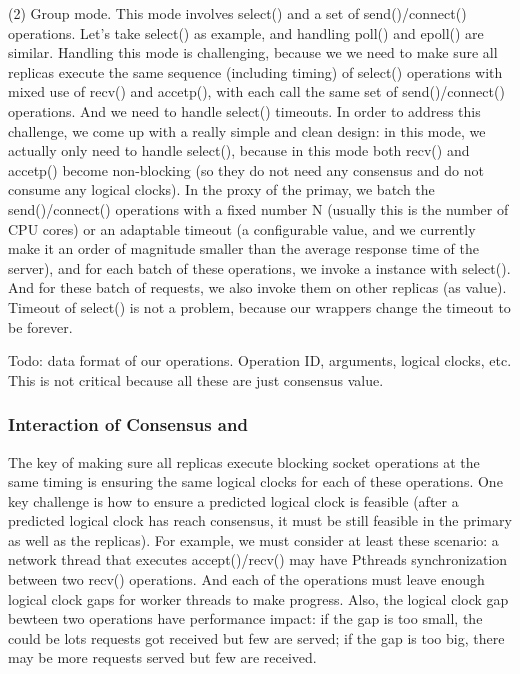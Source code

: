 (2) Group mode. This mode involves select() and a set of send()/connect() 
operations. Let's take select() as example, and handling poll() and epoll() are 
similar. Handling this mode is challenging, because we we need to make sure 
all replicas execute the same sequence (including timing) of 
select() operations with mixed use of recv() and accetp(), with each call 
the same set of send()/connect() operations. And we need to handle select() 
timeouts. In order to address this challenge, we come up with a really simple 
and clean design: in this mode, we actually only need to handle select(), 
because in this mode both recv() and accetp() become non-blocking (so they do 
not need any consensus and do not consume any logical clocks). In the 
proxy of the primay, we batch the send()/connect() operations with a fixed 
number N (usually this is the number of CPU cores) or an adaptable timeout (a 
configurable value, and we currently make it an order of magnitude smaller than the 
average response time of the server), and for each batch of these operations, 
we invoke a \paxos instance with select(). And for these batch of requests, we 
also invoke them on other replicas (as \paxos value). Timeout of select() is 
not a problem, because our \smt wrappers change the timeout to be forever.

Todo: data format of our operations. Operation ID, arguments, logical clocks, 
etc. This is not critical because all these are just \paxos consensus value.

\subsubsection{Interaction of Consensus and \smt} \label{sec:rep-interface}

The key of making sure all replicas execute blocking socket operations at the 
same timing is ensuring the same logical clocks for each of these operations. 
One key challenge is how to ensure a predicted logical clock is 
feasible (\ie after a predicted logical clock has reach consensus, it must be 
still feasible in the primary as well as the replicas). For example, we must 
consider at least these scenario: a network thread that executes 
accept()/recv() may have Pthreads synchronization between two recv() operations.
And each of the \paxos operations must leave enough logical clock gaps for 
worker threads to make progress. Also, the logical clock gap bewteen two \paxos 
operations have performance impact: if the gap is too small, the could be lots 
requests got received but few are served; if the gap is too big, there may be 
more requests served but few are received.

